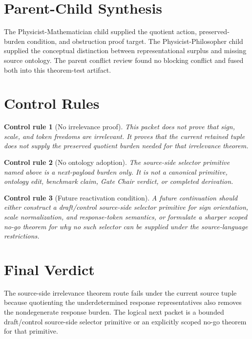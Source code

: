 \documentclass[11pt]{article}
\newtheorem{controlrule}{Control rule}
\begin{document}
\section{Parent-Child Synthesis}

The Physicist-Mathematician child supplied the quotient action,
preserved-burden condition, and obstruction proof target. The
Physicist-Philosopher child supplied the conceptual distinction
between representational surplus and missing source ontology. The
parent conflict review found no blocking conflict and fused both into
this theorem-test artifact.

\section{Control Rules}

\begin{controlrule}[No irrelevance proof]
This packet does not prove that sign, scale, and token freedoms are
irrelevant. It proves that the current retained tuple does not supply
the preserved quotient burden needed for that irrelevance theorem.
\end{controlrule}

\begin{controlrule}[No ontology adoption]
The source-side selector primitive named above is a next-payload
burden only. It is not a canonical primitive, ontology edit, benchmark
claim, Gate Chair verdict, or completed derivation.
\end{controlrule}

\begin{controlrule}[Future reactivation condition]
A future continuation should either construct a draft/control
source-side selector primitive for sign orientation, scale
normalization, and response-token semantics, or formulate a sharper
scoped no-go theorem for why no such selector can be supplied under
the source-language restrictions.
\end{controlrule}

\section{Final Verdict}

The source-side irrelevance theorem route fails under the current
source tuple because quotienting the underdetermined response
representatives also removes the nondegenerate response burden. The
logical next packet is a bounded draft/control source-side selector
primitive or an explicitly scoped no-go theorem for that primitive.
\end{document}
